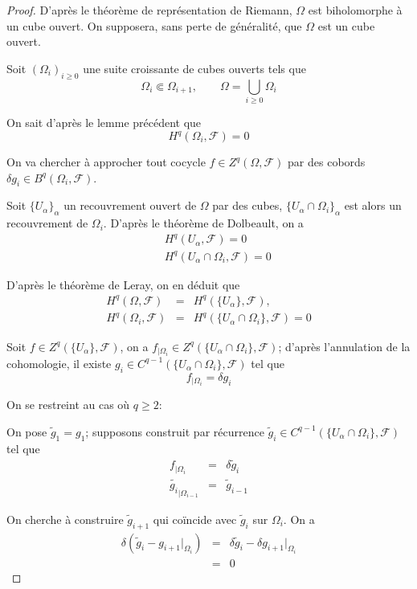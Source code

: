 \documentclass{article}
\theoremstyle{definition}
\theoremstyle{remarque}
\begin{document}
\begin{proof}
D'après le théorème de représentation de Riemann, $\Omega$ est biholomorphe à un cube ouvert. On supposera, sans perte de généralité, que $\Omega$ est un cube ouvert.

Soit $(\Omega_i)_{i \geq 0}$ une suite croissante de cubes ouverts tels que
\begin{equation*}
\Omega_i \Subset \Omega_{i+1}, \qquad
\Omega = \bigcup_{i \geq 0} \Omega_i
\end{equation*}

On sait d'après le lemme précédent que
$$H^q(\Omega_i, \mathcal{F})=0$$

On va chercher à approcher tout cocycle $f \in Z^q(\Omega, \mathcal{F})$ par des cobords $\delta g_i \in B^q(\Omega_i, \mathcal{F})$.

Soit $\{U_\alpha\}_\alpha$ un recouvrement ouvert de $\Omega$ par des cubes, $\{U_\alpha \cap \Omega_i\}_\alpha$ est alors un recouvrement de $\Omega_i$. D'après le théorème de Dolbeault, on a
\begin{eqnarray}
\nonumber &&H^q(U_\alpha, \mathcal{F}) = 0 \\
\nonumber &&H^q(U_\alpha \cap \Omega_i, \mathcal{F}) = 0
\end{eqnarray}


D'après le théorème de Leray, on en déduit que
\begin{eqnarray}
\nonumber H^q(\Omega, \mathcal{F}) &=& H^q(\{U_\alpha\}, \mathcal{F}), \\
\nonumber H^q(\Omega_i, \mathcal{F}) &=& H^q(\{U_\alpha \cap \Omega_i\}, \mathcal{F})=0
\end{eqnarray}

Soit $f \in Z^q(\{U_\alpha\}, \mathcal{F})$, on a $f_{|\Omega_i} \in Z^q(\{U_\alpha\cap \Omega_i\}, \mathcal{F})$; d'après l'annulation de la cohomologie, il existe $g_i \in C^{q-1}(\{U_\alpha\cap \Omega_i\}, \mathcal{F})$ tel que
$$f_{|\Omega_i} = \delta g_i$$

On se restreint au cas où $q \geq 2$:

On pose $\tilde{g}_1=g_1$; supposons construit par récurrence $\tilde{g}_i \in  C^{q-1}(\{U_\alpha\cap \Omega_i\}, \mathcal{F})$ tel que
\begin{eqnarray}
\nonumber f_{|\Omega_i} &=& \delta \tilde{g}_i \\
\nonumber \tilde{g_i}_{|\Omega_{i-1}} &=& \tilde{g}_{i-1}
\end{eqnarray}

On cherche à construire $\tilde{g}_{i+1}$ qui coïncide avec $\tilde{g}_i$ sur $\Omega_i$. On a
\begin{eqnarray}
\nonumber \delta(\tilde{g}_i - g_{i+1}{|_{\Omega_{i}}})&=& \delta \tilde{g}_i  - \delta g_{i+1}{|_{\Omega_{i}}}\\
\nonumber &=& 0
\end{eqnarray}


\end{proof}
\end{document}
